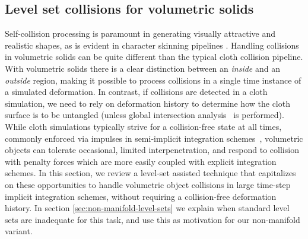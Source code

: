 \subsection{Level set collisions for volumetric solids}
\label{sec:self-collisions}


Self-collision processing is paramount in generating visually attractive and
realistic shapes, as is evident in character skinning pipelines
\cite{McAdaZSETTS:2011,VaillBGCRWGP:2013}. Handling collisions in
volumetric solids can be quite different than the typical cloth
collision pipeline. With volumetric solids there is a clear
distinction between an \emph{inside} and an \emph{outside} region,
making it possible to process collisions in a single time instance of
a simulated deformation. In contrast, if collisions are detected in a
cloth simulation, we need to rely on deformation history to determine
how the cloth surface is to be untangled (unless global intersection
analysis~\cite{BarafWK:2003} is performed). While cloth simulations
typically strive for a collision-free state at all times, commonly
enforced via impulses in semi-implicit integration
schemes~\cite{BridsMF:2003}, volumetric objects can tolerate
occasional, limited interpenetration, and respond to collision with
penalty forces which are more easily coupled with explicit integration
schemes. In this section, we review a level-set assisted technique
that capitalizes on these opportunities to handle volumetric object
collisions in large time-step implicit integration schemes, without
requiring a collision-free deformation history.  In section
\ref{sec:non-manifold-level-sets} we explain when standard level sets
are inadequate for this task, and use this as motivation for our
non-manifold variant.

